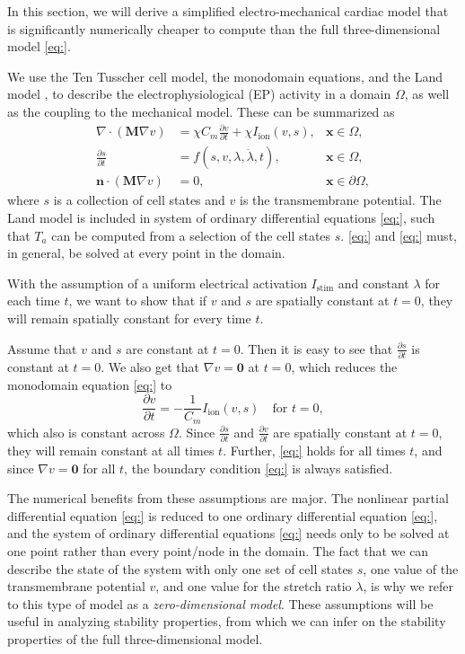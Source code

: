 In this section, we will derive a simplified electro-mechanical cardiac
model that is significantly numerically cheaper to compute than the full
three-dimensional model \eqref{eq:}.

We use the Ten Tusscher \cite{} cell model, the monodomain equations,
and the Land model \cite{}, to describe the electrophysiological (EP)
activity in a domain \(\Omega\), as well as the coupling to the
mechanical model. These can be summarized as \[
\begin{align}
\nabla \cdot(\mathbf{M}\nabla v) & =\chi C_{m}\frac{ \partial v }{ \partial t } +\chi I_\text{ion}(v,s), & \mathbf{x}\in \Omega , \\
\frac{ \partial s }{ \partial t } & =f(s,v,\lambda,\dot{\lambda},t), & \mathbf{x}\in \Omega, \\
\mathbf{n}\cdot(\mathbf{M}\nabla v) & =0, &\mathbf{x}\in \partial\Omega ,
\end{align}
\] where \(s\) is a collection of cell states and \(v\) is the
transmembrane potential. The Land model is included in system of
ordinary differential equations \eqref{eq:}, such that \(T_{a}\) can be
computed from a selection of the cell states \(s\). \eqref{eq:} and
\eqref{eq:} must, in general, be solved at every point in the domain.

With the assumption of a uniform electrical activation \(I_\text{stim}\)
and constant \(\lambda\) for each time \(t\), we want to show that if
\(v\) and \(s\) are spatially constant at \(t=0\), they will remain
spatially constant for every time \(t\).

Assume that \(v\) and \(s\) are constant at \(t=0\). Then it is easy to
see that \(\frac{ \partial s }{ \partial t }\) is constant at \(t=0\).
We also get that \(\nabla v=\boldsymbol{0}\) at \(t=0\), which reduces
the monodomain equation \eqref{eq:} to \[
\begin{equation}
\frac{ \partial v }{ \partial t } =-\frac{1}{C_{m}}I_\text{ion}(v,s)\quad \text{for } t=0,
\end{equation}
\] which also is constant across \(\Omega\). Since
\(\frac{ \partial s }{ \partial t }\) and
\(\frac{ \partial v }{ \partial t }\) are spatially constant at \(t=0\),
they will remain constant at all times \(t\). Further, \eqref{eq:} holds
for all times \(t\), and since \(\nabla v=\boldsymbol{0}\) for all
\(t\), the boundary condition \eqref{eq:} is always satisfied.

The numerical benefits from these assumptions are major. The nonlinear
partial differential equation \eqref{eq:} is reduced to one ordinary
differential equation \eqref{eq:}, and the system of ordinary
differential equations \eqref{eq:} needs only to be solved at one point
rather than every point/node in the domain. The fact that we can
describe the state of the system with only one set of cell states \(s\),
one value of the transmembrane potential \(v\), and one value for the
stretch ratio \(\lambda\), is why we refer to this type of model as a
\emph{zero-dimensional model}. These assumptions will be useful in
analyzing stability properties, from which we can infer on the stability
properties of the full three-dimensional model.

